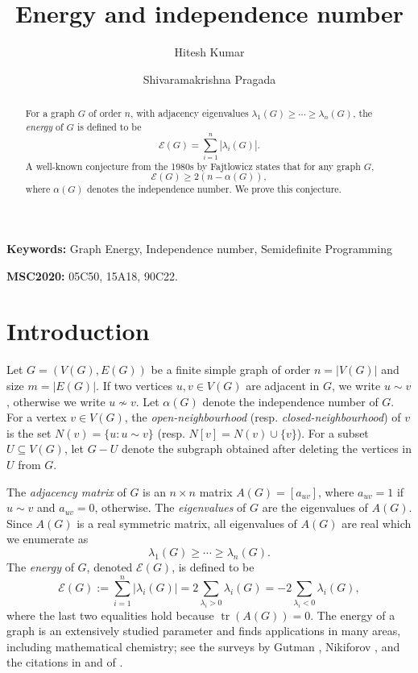 \documentclass[11pt]{article}
\title{\textbf{Energy and independence number}}
\author{Hitesh Kumar \and Shivaramakrishna Pragada}
\date{}
\theoremstyle{plain}
\numberwithin{equation}{section}
\DeclareMathOperator{\tr}{tr}
\begin{document}
\maketitle
\begin{abstract} 
For a graph $G$ of order $n$, with adjacency eigenvalues $\lambda_1(G) \geq  \cdots \geq \lambda_n(G)$, the \emph{energy} of $G$ is defined to be 
\[\mathcal{E}(G)=\sum_{i=1}^{n} |\lambda_i(G)|.\]
A well-known conjecture from the 1980s by Fajtlowicz states that for any graph $G$, 
\[\mathcal{E}(G) \ge 2\left(n-\alpha(G)\right),\]
where $\alpha(G)$ denotes the independence number. We prove this conjecture.
\end{abstract}

\noindent
\textbf{Keywords:} Graph Energy, Independence number, Semidefinite Programming

\noindent
\textbf{MSC2020:} 05C50, 15A18, 90C22.

\section{Introduction}

Let $G = (V(G), E(G))$ be a finite simple graph of order $n = |V(G)|$ and size $m = |E(G)|$. If two vertices $u, v\in V(G)$ are adjacent in $G$, we write $u\sim v$, otherwise we write $u\nsim v$. Let $\alpha(G)$ denote the independence number of $G$. For a vertex $v\in V(G)$, the \emph{open-neighbourhood} (resp. \emph{closed-neighbourhood}) of $v$ is the set $N(v)=\{u: u\sim v\}$ (resp. $N[v] = N(v)\cup \{v\}$). For a subset $U \subseteq V(G)$, let $G-U$ denote the subgraph obtained after deleting the vertices in $U$ from $G$. 

The \textit{adjacency matrix} of $G$ is an $n\times n$ matrix $A(G) = [a_{uv}]$, where $a_{uv} = 1$ if $u\sim v$ and $a_{uv} = 0$, otherwise. The \emph{eigenvalues} of $G$ are the eigenvalues of $A(G)$. Since $A(G)$ is a real symmetric matrix, all eigenvalues of $A(G)$ are real which we enumerate as 
\[\lambda_1(G) \geq  \cdots \geq \lambda_n(G).\] 
The \emph{energy} of $G$, denoted $\mathcal{E}(G)$, is defined to be 
\[\mathcal{E}(G):=\sum_{i=1}^{n} |\lambda_i(G)| = 2\sum_{\lambda_i > 0} \lambda_i(G) = -2\sum_{\lambda_i < 0} \lambda_i(G),\]
where the last two equalities hold because $\tr(A(G)) = 0$. The energy of a graph is an extensively studied parameter and finds applications in many areas, including mathematical chemistry; see the surveys by Gutman \cite{Gutman_2001, Gutman_2017_survey}, Nikiforov \cite{Nikiforov_2016_GraphEnergy}, and the citations in and of \cite{Abiad_2025_SDPlenses, Akbari_Seidel_2020, Einollahzadeh_2024}.
\end{document}
